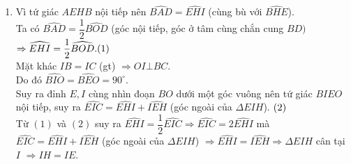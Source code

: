\begin{bt}
{\begin{enumerate}
			\item Vì tứ giác $AEHB$ nội tiếp nên $\widehat{BAD}=\widehat{EHI}$ (cùng bù với $\widehat{BHE}$).\\
			Ta có $\widehat{BAD}=\dfrac{1}{2} \widehat{BOD}$ (góc nội tiếp, góc ở tâm cùng chắn cung $BD)$\\
			$\Rightarrow \widehat{EHI}=\dfrac{1}{2} \widehat{BOD}.  \hfill (1)$\\
			Mặt khác $IB=IC$ (gt)
			$\Rightarrow OI\bot BC$.\\
			Do đó $\widehat{BIO}=\widehat{BEO}=90^{\circ}$.\\
			Suy ra đỉnh $E,I$ cùng nhìn đoạn $BO$ dưới một góc vuông nên tứ giác $BIEO$ nội tiếp, suy ra $ \widehat{EIC}=\widehat{EHI}+\widehat{IEH}$ (góc ngoài của $\Delta EIH$).  $\hfill (2)$\\			
			Từ $\left(1\right)$ và $\left(2\right)$ suy ra $\widehat{EHI}=\dfrac{1}{2} \widehat{EIC}\Rightarrow \widehat{EIC}=2\widehat{EHI}$ mà $\widehat{EIC}=\widehat{EHI}+\widehat{IEH}$ (góc ngoài của $\Delta EIH$) $\Rightarrow \widehat{EHI}=\widehat{IEH}\Rightarrow \Delta EIH$ cân tại $I$ $\Rightarrow IH=IE$.
		\end{enumerate}
	}
\end{bt}



